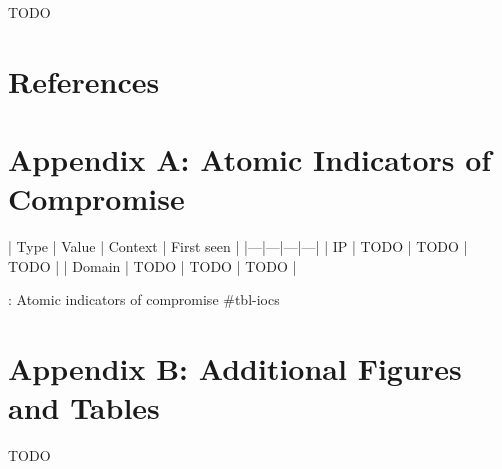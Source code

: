 \documentclass[
  a4paper,
  table]{article}
\begin{document}
TODO

\section*{References}\label{references}

\renewcommand{\bibsection}{}


\newpage
\appendix

\section*{Appendix A: Atomic Indicators of
Compromise}\label{appendix-a-atomic-indicators-of-compromise}

\begin{landscape}

| Type | Value | Context | First seen |
|---|---|---|---|
| IP | TODO | TODO | TODO |
| Domain | TODO | TODO | TODO |

: Atomic indicators of compromise {#tbl-iocs}

\end{landscape}

\section*{Appendix B: Additional Figures and
Tables}\label{appendix-b-additional-figures-and-tables}

TODO
\end{document}
